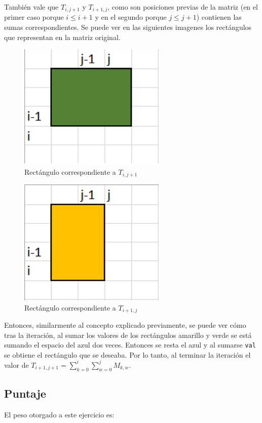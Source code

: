 También vale que $T_{i,j+1}$ y $T_{i+1,j}$, como son posiciones previas de la matriz (en el primer caso porque $i \leq i+1$ y en el segundo porque $j \leq j+1$) contienen las sumas correspondientes. Se puede ver en las siguientes imagenes los rectángulos que representan en la matriz original.

\begin{figure}[H]
\centering
\includegraphics[width=7cm]{Imagenes/Ej3g.png}
\caption{Rectángulo correspondiente a $T_{i,j+1}$}
\end{figure}

\begin{figure}[H]
\centering
\includegraphics[width=7cm]{Imagenes/Ej3h.png}
\caption{Rectángulo correspondiente a $T_{i+1,j}$}
\end{figure}

Entonces, similarmente al concepto explicado previamente, se puede ver cómo tras la iteración, al sumar los valores de los rectángulos amarillo y verde se está sumando el espacio del azul dos veces. Entonces se resta el azul y al sumarse \texttt{val} se obtiene el rectángulo que se deseaba. Por lo tanto, al terminar la iteración el valor de $T_{i+1,j+1} = \sum_{k=0}^{i} \sum_{w=0}^{j} M_{k,w}$. 

\subsection{Puntaje}
El peso otorgado a este ejercicio es:
